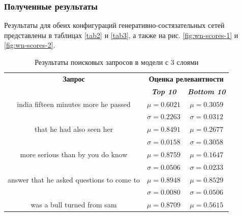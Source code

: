 \subsubsection{Полученные результаты}
Результаты для обеих конфигураций генеративно-состязательных сетей представлены в таблицах \ref{tab2} и \ref{tab3}, а также на рис. \ref{fig:wn-scores-1}
и  \ref{fig:wn-scores-2}.
\begin{table}[tbp]
    \caption{Результаты поисковых запросов в модели с 3 слоями}
    \begin{center}
        \begin{tabular}{ccc}
            \toprule
            \textbf{Запрос}                           & \multicolumn{2}{c}{\textbf{Оценка релевантности}}                               \\
                                                      & \textbf{\textit{Top 10}}                          & \textbf{\textit{Bottom 10}} \\
            \midrule
            india  fifteen minutes more he passed     & \(\mu=0.6021\)                                    & \(\mu=0.3059\)              \\
                                                      & \(\sigma=0.2263\)                                 & \(\sigma=0.0312\)           \\
            \midrule
            that he had also seen her                 & \(\mu=0.8491\)                                    & \(\mu=0.2677\)              \\
                                                      & \(\sigma=0.0158\)                                 & \(\sigma=0.3058\)           \\
            \midrule
            more serious than by you do know          & \(\mu=0.8759\)                                    & \(\mu=0.1647\)              \\
                                                      & \(\sigma=0.0506\)                                 & \(\sigma=0.0233\)           \\
            \midrule
            answer that he asked questions to come to & \(\mu=0.8948\)                                    & \(\mu=0.8529\)              \\
                                                      & \(\sigma=0.0080\)                                 & \(\sigma=0.0506\)           \\
            \midrule
            was a bull turned from sam                & \(\mu=0.8709\)                                    & \(\mu=0.5615\)              \\

\end{tabular}
\end{center}
\end{table}
